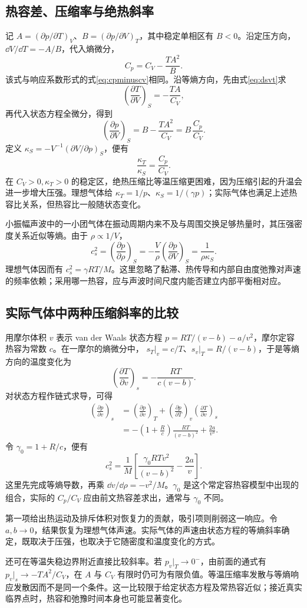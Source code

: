 \subsection{热容差、压缩率与绝热斜率}
\label{th:compressibilityratio}
记 $A=(\partial p/\partial T)_V$、$B=(\partial p/\partial V)_T$，其中稳定单相区有 $B<0$。沿定压方向，$\dd V/\dd T=-A/B$，代入熵微分，
\[
 C_p=C_V-\frac{TA^2}{B}.
\]
该式与响应系数形式的式\eqref{eq:cpminuscv}相同。沿等熵方向，先由式\eqref{eq:dsvt}求
\[
 \left(\frac{\partial T}{\partial V}\right)_S
 =-\frac{TA}{C_V},
\]
再代入状态方程全微分，得到
\[
 \left(\frac{\partial p}{\partial V}\right)_S
 =B-\frac{TA^2}{C_V}
 =B\,\frac{C_p}{C_V}.
\]
定义 $\kappa_S=-V^{-1}(\partial V/\partial p)_S$，便有
\[
 \frac{\kappa_T}{\kappa_S}=\frac{C_p}{C_V}.
\]
在 $C_V>0,\kappa_T>0$ 的稳定区，绝热压缩比等温压缩更困难，因为压缩引起的升温会进一步增大压强。理想气体给 $\kappa_T=1/p$、$\kappa_S=1/(\gamma p)$；实际气体也满足上述热容比关系，但热容比一般随状态变化。

小振幅声波中的一小团气体在振动周期内来不及与周围交换足够热量时，其压强密度关系近似等熵。由于 $\rho\propto1/V$，
\[
 c_s^2=\left(\frac{\partial p}{\partial\rho}\right)_S
 =-\frac{V}{\rho}\left(\frac{\partial p}{\partial V}\right)_S
 =\frac1{\rho\kappa_S}.
\]
理想气体因而有 $c_s^2=\gamma RT/M$。这里忽略了黏滞、热传导和内部自由度弛豫对声速的频率依赖；采用哪一热容，应与声波时间尺度内能否建立内部平衡相对应。

\subsection{实际气体中两种压缩斜率的比较}
用摩尔体积 $v$ 表示 van der Waals 状态方程
$p=RT/(v-b)-a/v^2$，摩尔定容热容为常数 $c$。在一摩尔的熵微分中，
$s_T|_v=c/T$、$s_v|_T=R/(v-b)$，于是等熵方向的温度变化为
\[
 \left(\frac{\partial T}{\partial v}\right)_s
 =-\frac{RT}{c(v-b)}.
\]
对状态方程作链式求导，可得
\begin{align*}
 \left(\frac{\partial p}{\partial v}\right)_s
 &=\left(\frac{\partial p}{\partial v}\right)_T+
 \left(\frac{\partial p}{\partial T}\right)_v
 \left(\frac{\partial T}{\partial v}\right)_s\\
 &=-\left(1+\frac Rc\right)\frac{RT}{(v-b)^2}
 +\frac{2a}{v^3}.
\end{align*}
令 $\gamma_0=1+R/c$，便有
\[
 c_s^2=\frac1M\left[
 \frac{\gamma_0RTv^2}{(v-b)^2}-\frac{2a}{v}\right].
\]
这里先完成等熵导数，再乘 $\dd v/\dd\rho=-v^2/M$。$\gamma_0$ 是这个常定容热容模型中出现的组合，实际的 $C_p/C_V$ 应由前文热容差求出，通常与 $\gamma_0$ 不同。

第一项给出热运动及排斥体积对恢复力的贡献，吸引项则削弱这一响应。令 $a,b\to0$，结果恢复为理想气体声速。实际气体的声速由状态方程的等熵斜率确定，既取决于压强，也取决于它随密度和温度变化的方式。

还可在等温失稳边界附近直接比较斜率。若 $p_v|_T\to0^-$，由前面的通式有
$p_v|_s\to-TA^2/C_V$，在 $A$ 与 $C_V$ 有限时仍可为有限负值。等温压缩率发散与等熵响应发散因而不是同一个条件。这一比较限于给定状态方程及常热容近似；接近真实临界点时，热容和弛豫时间本身也可能显著变化。

